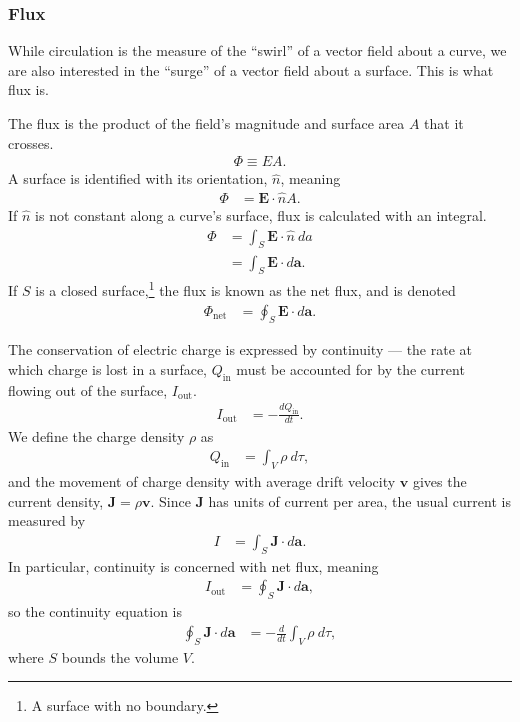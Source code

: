 \documentclass[10pt]{mypackage}
\begin{document}
\subsubsection{Flux}%
While circulation is the measure of the ``swirl'' of a vector field about a curve, we are also interested in the ``surge'' of a vector field about a surface. This is what flux is.
\begin{definition}[Flux]
The flux is the product of the field's magnitude and surface area $A$ that it crosses.
\begin{align*}
  \Phi \equiv EA.
\end{align*}
A surface is identified with its orientation, $\widehat{n}$, meaning
\begin{align*}
  \Phi &= \mathbf{E}\cdot \widehat{n} A.
\end{align*}
If $\widehat{n}$ is not constant along a curve's surface, flux is calculated with an integral.
\begin{align*}
  \Phi &= \int_{S}^{} \mathbf{E}\cdot \widehat{n}\:da\\
       &= \int_{S}^{} \mathbf{E}\cdot d\mathbf{a}.
\end{align*}
If $S$ is a closed surface,\footnote{A surface with no boundary.} the flux is known as the net flux, and is denoted
\begin{align*}
  \Phi_{\text{net}} &= \oint_{S}^{} \mathbf{E}\cdot d\mathbf{a}.
\end{align*}
\end{definition}
\begin{example}
  The conservation of electric charge is expressed by continuity --- the rate at which charge is lost in a surface, $Q_{\text{in}}$ must be accounted for by the current flowing out of the surface, $I_{\text{out}}$.
  \begin{align*}
    I_{\text{out}} &= -\frac{dQ_{\text{in}}}{dt}.
  \end{align*}
  We define the charge density $\rho$ as
  \begin{align*}
    Q_{\text{in}} &= \int_{V}^{} \rho\:d\tau,
  \end{align*}
  and the movement of charge density with average drift velocity $\mathbf{v}$ gives the current density, $\mathbf{J} = \rho \mathbf{v}$. Since $\mathbf{J}$ has units of current per area, the usual current is measured by
  \begin{align*}
    I &= \int_{S}^{} \mathbf{J}\cdot d\mathbf{a}.
  \end{align*}
  In particular, continuity is concerned with net flux, meaning
  \begin{align*}
    I_{\text{out}} &= \oint_{S}^{} \mathbf{J} \cdot d\mathbf{a},
  \end{align*}
  so the continuity equation is
  \begin{align*}
    \oint_{S}^{} \mathbf{J}\cdot d\mathbf{a} &= -\frac{d}{dt}\int_{V}^{} \rho\:d\tau,
  \end{align*}
  where $S$ bounds the volume $V$.
\end{example}
\end{document}

